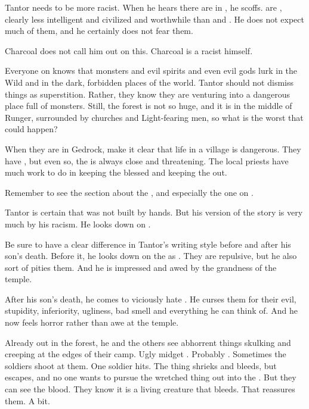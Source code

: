 \begin{changes}
    Tantor needs to be more racist. 
    When he hears there are \meccara{} in \EreshKal, he scoffs. 
    \Meccara{} are , clearly less intelligent and civilized and worthwhile than \humans{} and \scathae. 
    He does not expect much of them, and he certainly does not fear them. 
    
    Charcoal does not call him out on this. 
    Charcoal is a racist himself.

    Everyone on \Azmith knows that monsters and evil spirits and even evil gods lurk in the Wild and in the dark, forbidden places of the world.
    \Jirad Tantor should not dismiss things as superstition.
    Rather, they know they are venturing into a dangerous place full of monsters.
    Still, the forest is not so huge, and it is in the middle of Runger, surrounded by churches and Light-fearing men, so what is the worst that could happen?
    
    When they are in Gedrock, make it clear that life in a village is dangerous. 
    They have \eidola, but even so, the \wylde is always close and threatening.
    The local priests have much work to do in keeping the \eidola blessed and keeping the \wylde out. 

    Remember to see the section about the , and especially the one on . 
    
    Tantor is certain that \EreshKal was not built by \meccaran hands. 
    But his version of the story is very much \coloured by his racism. 
    He looks down on \meccara. 
    
    Be sure to have a clear difference in Tantor's writing style before and after his son's death. 
    Before it, he looks down on the \meccara as . 
    They are repulsive, but he also sort of pities them. 
    And he is impressed and awed by the grandness of the temple. 
    
    After his son's death, he comes to viciously hate \meccara. 
    He curses them for their evil, stupidity, inferiority, ugliness, bad smell and everything he can think of. 
    And he now feels horror rather than awe at the temple. 
    
    Already out in the forest, he and the others see abhorrent things skulking and creeping at the edges of their camp. 
    Ugly midget \humanoids. 
    Probably \meccara. 
    Sometimes the soldiers shoot at them. 
    One soldier hits. 
    The thing shrieks and bleeds, but escapes, and no one wants to pursue the wretched thing out into the \wylde. 
    But they can see the blood. 
    They know it is a living creature that bleeds. 
    That reassures them. 
    A bit. 
    

\end{changes}
